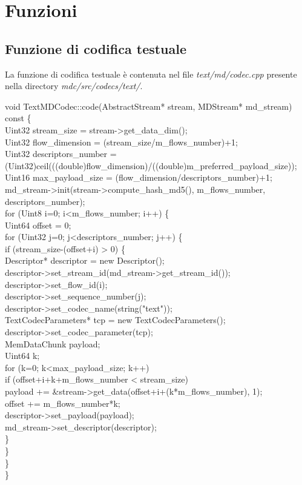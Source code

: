 \chapter{Funzioni}
\section{Funzione di codifica testuale}

La funzione di codifica testuale è contenuta nel file
\textit{text/md/codec.cpp} presente nella directory
\textit{mdc/src/codecs/text/}.

\begin{code}
void TextMDCodec::code(AbstractStream* stream, MDStream* md\_stream) const \{\\
	Uint32 stream\_size = stream->get\_data\_dim();\\
	Uint32 flow\_dimension = (stream\_size/m\_flows\_number)+1;\\
	Uint32 descriptors\_number = \\(Uint32)ceil(((double)flow\_dimension)/((double)m\_preferred\_payload\_size));\\
	Uint16 max\_payload\_size = (flow\_dimension/descriptors\_number)+1;\\
	md\_stream->init(stream->compute\_hash\_md5(), m\_flows\_number, descriptors\_number);\\
	for (Uint8 i=0; i<m\_flows\_number; i++) \{\\
		Uint64 offset = 0;\\
		for (Uint32 j=0; j<descriptors\_number; j++) \{\\
			if (stream\_size-(offset+i) > 0) \{\\
				Descriptor* descriptor = new Descriptor();\\
				descriptor->set\_stream\_id(md\_stream->get\_stream\_id());\\
				descriptor->set\_flow\_id(i);\\
				descriptor->set\_sequence\_number(j);\\
				descriptor->set\_codec\_name(string("text"));\\
				TextCodecParameters* tcp = new TextCodecParameters();\\
				descriptor->set\_codec\_parameter(tcp);\\
				MemDataChunk payload;\\
				Uint64 k;\\
				for (k=0; k<max\_payload\_size; k++)\\
					if (offset+i+k+m\_flows\_number < stream\_size)\\
						payload += \&stream->get\_data(offset+i+(k*m\_flows\_number), 1);\\
				offset += m\_flows\_number*k;\\
				descriptor->set\_payload(payload);\\
				md\_stream->set\_descriptor(descriptor);\\
			\}\\
		\}\\
	\}\\
\}\\
\end{code}

